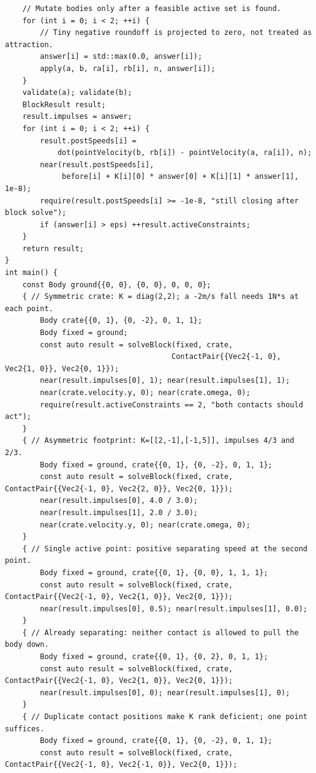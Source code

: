 \begin{verbatim}
    // Mutate bodies only after a feasible active set is found.
    for (int i = 0; i < 2; ++i) {
        // Tiny negative roundoff is projected to zero, not treated as attraction.
        answer[i] = std::max(0.0, answer[i]);
        apply(a, b, ra[i], rb[i], n, answer[i]);
    }
    validate(a); validate(b);
    BlockResult result;
    result.impulses = answer;
    for (int i = 0; i < 2; ++i) {
        result.postSpeeds[i] =
            dot(pointVelocity(b, rb[i]) - pointVelocity(a, ra[i]), n);
        near(result.postSpeeds[i],
             before[i] + K[i][0] * answer[0] + K[i][1] * answer[1], 1e-8);
        require(result.postSpeeds[i] >= -1e-8, "still closing after block solve");
        if (answer[i] > eps) ++result.activeConstraints;
    }
    return result;
}
int main() {
    const Body ground{{0, 0}, {0, 0}, 0, 0, 0};
    { // Symmetric crate: K = diag(2,2); a -2m/s fall needs 1N*s at each point.
        Body crate{{0, 1}, {0, -2}, 0, 1, 1};
        Body fixed = ground;
        const auto result = solveBlock(fixed, crate,
                                      ContactPair{{Vec2{-1, 0}, Vec2{1, 0}}, Vec2{0, 1}});
        near(result.impulses[0], 1); near(result.impulses[1], 1);
        near(crate.velocity.y, 0); near(crate.omega, 0);
        require(result.activeConstraints == 2, "both contacts should act");
    }
    { // Asymmetric footprint: K=[[2,-1],[-1,5]], impulses 4/3 and 2/3.
        Body fixed = ground, crate{{0, 1}, {0, -2}, 0, 1, 1};
        const auto result = solveBlock(fixed, crate, ContactPair{{Vec2{-1, 0}, Vec2{2, 0}}, Vec2{0, 1}});
        near(result.impulses[0], 4.0 / 3.0);
        near(result.impulses[1], 2.0 / 3.0);
        near(crate.velocity.y, 0); near(crate.omega, 0);
    }
    { // Single active point: positive separating speed at the second point.
        Body fixed = ground, crate{{0, 1}, {0, 0}, 1, 1, 1};
        const auto result = solveBlock(fixed, crate, ContactPair{{Vec2{-1, 0}, Vec2{1, 0}}, Vec2{0, 1}});
        near(result.impulses[0], 0.5); near(result.impulses[1], 0.0);
    }
    { // Already separating: neither contact is allowed to pull the body down.
        Body fixed = ground, crate{{0, 1}, {0, 2}, 0, 1, 1};
        const auto result = solveBlock(fixed, crate, ContactPair{{Vec2{-1, 0}, Vec2{1, 0}}, Vec2{0, 1}});
        near(result.impulses[0], 0); near(result.impulses[1], 0);
    }
    { // Duplicate contact positions make K rank deficient; one point suffices.
        Body fixed = ground, crate{{0, 1}, {0, -2}, 0, 1, 1};
        const auto result = solveBlock(fixed, crate, ContactPair{{Vec2{-1, 0}, Vec2{-1, 0}}, Vec2{0, 1}});

\end{verbatim}
